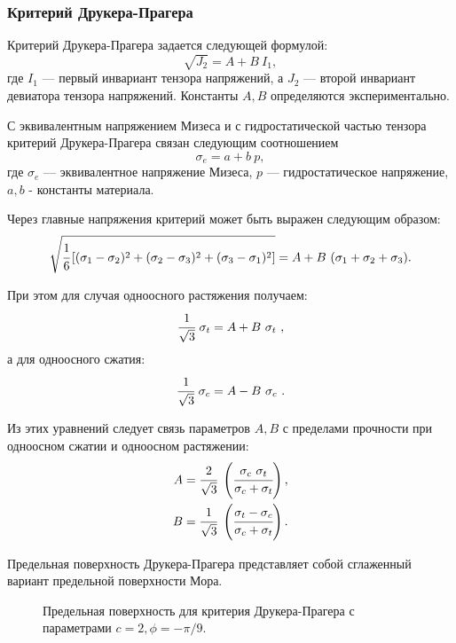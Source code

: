 \subsubsection{Критерий Друкера-Прагера}

Критерий Друкера-Прагера задается следующей формулой:
\begin{equation}
\sqrt{J_2} = A + B~I_1,
\end{equation}
где $I_1$ — первый инвариант тензора напряжений, а $J_2$ — второй инвариант девиатора тензора напряжений. Константы $A, B$ определяются экспериментально.

С эквивалентным напряжением Мизеса и с гидростатической частью тензора критерий Друкера-Прагера связан следующим соотношением
\begin{equation}
\sigma_e = a + b~p,
\end{equation}
где $\sigma_e$ — эквивалентное напряжение Мизеса, $p$ — гидростатическое напряжение, $a,b$ - константы материала.

Через главные напряжения критерий может быть выражен следующим образом:
\begin{equation}
\sqrt{\cfrac{1}{6}\left[(\sigma_1-\sigma_2)^2+(\sigma_2-\sigma_3)^2+(\sigma_3-\sigma_1)^2\right]} = A + B~(\sigma_1+\sigma_2+\sigma_3).
\end{equation}

При этом для случая одноосного растяжения получаем:
\begin{equation}
\cfrac{1}{\sqrt{3}}~\sigma_t = A + B~\sigma_t ~,
\end{equation}
а для одноосного сжатия:
\begin{equation}
\cfrac{1}{\sqrt{3}}~\sigma_c = A - B~\sigma_c ~.
\end{equation}

Из этих уравнений следует связь параметров $A, B$ с пределами прочности при одноосном сжатии и одноосном растяжении:
\begin{eqnarray}
A = \cfrac{2}{\sqrt{3}}~\left(\cfrac{\sigma_c~\sigma_t}{\sigma_c+\sigma_t}\right), \\
B = \cfrac{1}{\sqrt{3}}~\left(\cfrac{\sigma_t-\sigma_c}{\sigma_c+\sigma_t}\right).
\end{eqnarray}

Предельная поверхность Друкера-Прагера представляет собой сглаженный вариант предельной поверхности Мора.

\begin{figure}[h]
\caption{Предельная поверхность для критерия Друкера-Прагера с параметрами $c = 2, \phi = -\pi/9$.}
\end{figure}

